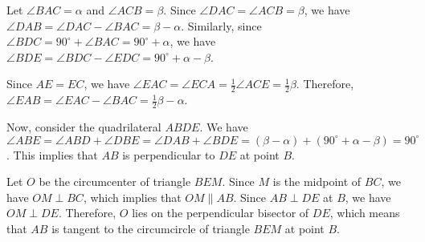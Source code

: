 Let \( \angle BAC = \alpha \) and \( \angle ACB = \beta \). Since \( \angle DAC = \angle ACB = \beta \), we have \( \angle DAB = \angle DAC - \angle BAC = \beta - \alpha \). Similarly, since \( \angle BDC = 90^\circ + \angle BAC = 90^\circ + \alpha \), we have \( \angle BDE = \angle BDC - \angle EDC = 90^\circ + \alpha - \beta \).

Since \( AE = EC \), we have \( \angle EAC = \angle ECA = \frac{1}{2} \angle ACE = \frac{1}{2} \beta \). Therefore, \( \angle EAB = \angle EAC - \angle BAC = \frac{1}{2} \beta - \alpha \).

Now, consider the quadrilateral \( ABDE \). We have \( \angle ABE = \angle ABD + \angle DBE = \angle DAB + \angle BDE = (\beta - \alpha) + (90^\circ + \alpha - \beta) = 90^\circ \). This implies that \( AB \) is perpendicular to \( DE \) at point \( B \).

Let \( O \) be the circumcenter of triangle \( BEM \). Since \( M \) is the midpoint of \( BC \), we have \( OM \perp BC \), which implies that \( OM \parallel AB \). Since \( AB \perp DE \) at \( B \), we have \( OM \perp DE \). Therefore, \( O \) lies on the perpendicular bisector of \( DE \), which means that \( AB \) is tangent to the circumcircle of triangle \( BEM \) at point \( B \).

